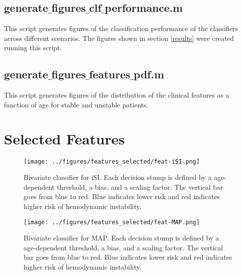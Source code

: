 \documentclass[
   technote
]{phildoc}
\begin{document}


\cleardoublepage 
\newpage

\subsection{generate$\_$figures$\_$clf$\_$performance.m}
This script generates figures of the classification performance of the classifiers across different scenarios. The figures shown in section \ref{results} were created running this script.      



\cleardoublepage 
\newpage

\subsection{generate$\_$figures$\_$features$\_$pdf.m}
This script generates figures of the distribution of the clinical features as a function of age for stable and unstable patients.      



\cleardoublepage 
\newpage

\section{Selected Features}
\begin{figure}[h!]
	\centering
	\texttt{[image: ../figures/features\_selected/feat-iSI.png]}
	\caption{Bivariate classifier for iSI. Each decision stump is defined by a age-dependent threshold, a bias, and a scaling factor. The vertical bar goes from blue to red. Blue indicates lower risk and red indicates higher risk of hemodynamic instability.}      
\end{figure}

\begin{figure}[h!]
	\centering
	\texttt{[image: ../figures/features\_selected/feat-MAP.png]}
	\caption{Bivariate classifier for MAP. Each decision stump is defined by a age-dependent threshold, a bias, and a scaling factor. The vertical bar goes from blue to red. Blue indicates lower risk and red indicates higher risk of hemodynamic instability.}      
\end{figure}
\end{document}
